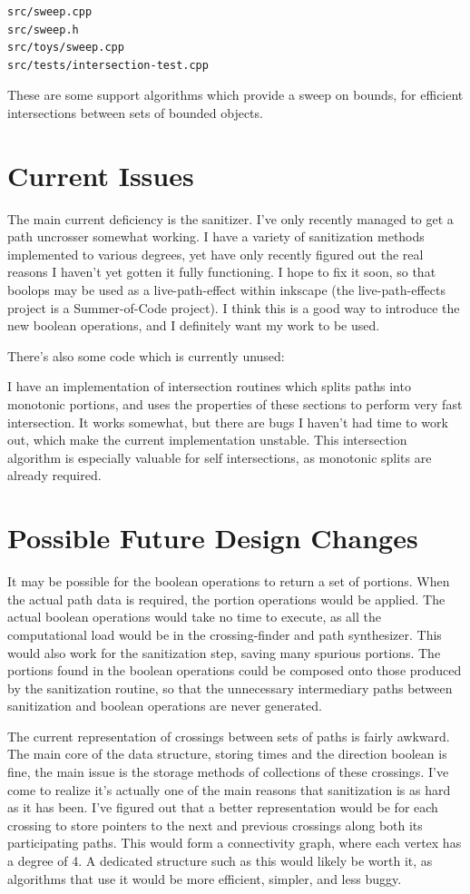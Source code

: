 \documentclass[openany]{book}
\begin{document}
\begin{verbatim}
src/sweep.cpp
src/sweep.h
src/toys/sweep.cpp
src/tests/intersection-test.cpp
\end{verbatim}

These are some support algorithms which provide a sweep on bounds, for efficient intersections between sets of bounded objects.
\section{Current Issues}

The main current deficiency is the sanitizer. I've only recently managed to get a path uncrosser somewhat working. I have a variety of sanitization methods implemented to various degrees, yet have only recently figured out the real reasons I haven't yet gotten it fully functioning. I hope to fix it soon, so that boolops may be used as a live-path-effect within inkscape (the live-path-effects project is a Summer-of-Code project). I think this is a good way to introduce the new boolean operations, and I definitely want my work to be used.

There's also some code which is currently unused:

I have an implementation of intersection routines which splits paths into monotonic portions, and uses the properties of these sections to perform very fast intersection. It works somewhat, but there are bugs I haven't had time to work out, which make the current implementation unstable. This intersection algorithm is especially valuable for self intersections, as monotonic splits are already required.

\section{Possible Future Design Changes}

It may be possible for the boolean operations to return a set of portions. When the actual path data is required, the portion operations would be applied. The actual boolean operations would take no time to execute, as all the computational load would be in the crossing-finder and path synthesizer. This would also work for the sanitization step, saving many spurious portions. The portions found in the boolean operations could be composed onto those produced by the sanitization routine, so that the unnecessary intermediary paths between sanitization and boolean operations are never generated.

The current representation of crossings between sets of paths is fairly awkward. The main core of the data structure, storing times and the direction boolean is fine, the main issue is the storage methods of collections of these crossings. I've come to realize it's actually one of the main reasons that sanitization is as hard as it has been. I've figured out that a better representation would be for each crossing to store pointers to the next and previous crossings along both its participating paths. This would form a connectivity graph, where each vertex has a degree of 4. A dedicated structure such as this would likely be worth it, as algorithms that use it would be more efficient, simpler, and less buggy.
\end{document}
